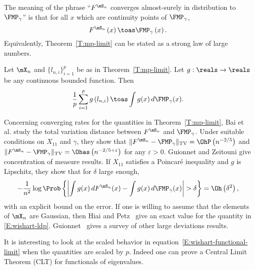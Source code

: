 The meaning of the phrase ``$F^{\mS_n}$ converges almost-surely in distribution to $\FMP_\gamma$'' is that for all $x$ which are continuity points of $\FMP_\gamma$,
\begin{equation}\label{E:spectral-measure-limit-point}
    F^{\mS_n} \left(
        x
    \right)
    \toas
    \FMP_\gamma \left(
        x
    \right).
\end{equation}
Equivalently, Theorem~\ref{T:mp-limit} can be stated as a strong law of large numbers.

\begin{corollary}
    Let $\mX_n$ and $\{ l_{n,i} \}_{i=1}^{p}$ be as in 
    Theorem~\ref{T:mp-limit}.  Let $g : \reals \to \reals$ be any
    continuous bounded function.  Then
    \begin{equation}\label{E:wishart-functional-limit}
        \frac{1}{p}
        \sum_{i=1}^p
            g \left( l_{n,i} \right)
        \toas
        \int
            g(x)
            \,
            d\FMP_\gamma ( x ).
    \end{equation}
\end{corollary}

Concerning converging rates for the quantities in Theorem~\ref{T:mp-limit},  Bai et al. \cite{bai2003crs} study the total variation distance between $F^{\mS_n}$ and $\FMP_\gamma$.  Under suitable conditions on $X_{11}$ and $\gamma$, they show that
\(
    \| F^{\mS_n} - \FMP_\gamma \|_\text{TV}
    =
    \OhP\left( n^{-2/5} \right)
\)
and
\(
    \| F^{\mS_n} - \FMP_\gamma \|_\text{TV}
    =
    \Ohas\left( n^{-2/5 + \varepsilon} \right)
\)
for any $\varepsilon > 0$.
Guionnet and Zeitouni \cite{guionnet2000csm} give concentration of measure results.  If $X_{11}$ satisfies a Poincar\'e inequality and $g$ is Lipschitz, they show that for $\delta$ large enough,
\begin{equation}\label{E:wishart-ldp}
    -
    \frac{1}{n^2}
    \log \Prob\left\{ 
        \left|
            \int g(x) \, dF^{\mS_n}(x) - \int g(x) \, d\FMP_\gamma(x)
        \right|
        >
        \delta
    \right\}
    =
    \Oh\left(
        \delta^2
    \right),
\end{equation}
with an explicit bound on the error. If one is willing to assume that the elements of $\mX_n$ are Gaussian, then Hiai and Petz~\cite{hiai1998edw} give an exact value for the quantity in \eqref{E:wishart-ldp}.  Guionnet~\cite{guionnetlds} gives a survey of other large deviations results.  

It is interesting to look at the scaled behavior in equation~\eqref{E:wishart-functional-limit} when the quantities are scaled by $p$.  Indeed one can prove a Central Limit Theorem (CLT) for functionals of eigenvalues.

